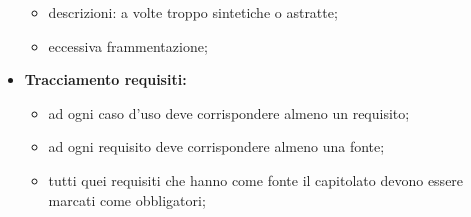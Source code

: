 \begin{itemize}
\begin{itemize}
		\item descrizioni: a volte troppo sintetiche o astratte;
		\item eccessiva frammentazione;
	\end{itemize}
	\item \textbf{Tracciamento requisiti:}
	\begin{itemize}
		\item ad ogni caso d'uso deve corrispondere almeno un requisito;
		\item ad ogni requisito deve corrispondere almeno una fonte;
		\item tutti quei requisiti che hanno come fonte il capitolato devono essere marcati come obbligatori;
	\end{itemize}
\end{itemize}

